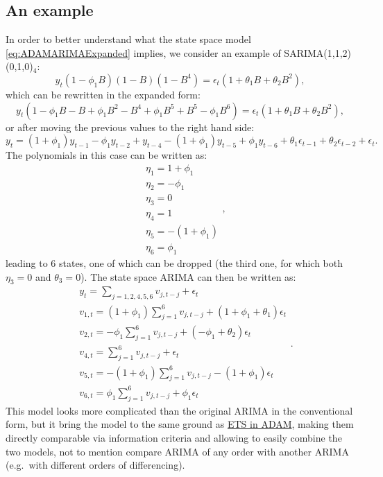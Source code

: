 \documentclass[
]{book}
\theoremstyle{definition}
\theoremstyle{definition}
\theoremstyle{definition}
\theoremstyle{definition}
\theoremstyle{remark}
\begin{document}
\hypertarget{an-example}{%
\subsection{An example}\label{an-example}}

In order to better understand what the state space model \eqref{eq:ADAMARIMAExpanded} implies, we consider an example of SARIMA(1,1,2)(0,1,0)\(_4\):
\begin{equation*}
    {y}_{t} (1- \phi_1 B)(1-B)(1-B^4) = \epsilon_t (1 + \theta_1 B + \theta_2 B^2),
\end{equation*}
which can be rewritten in the expanded form:
\begin{equation*}
    {y}_{t} (1-\phi_1 B - B + \phi_1 B^2 - B^4 +\phi_1 B^5 + B^5 - \phi_1 B^6) = \epsilon_t (1 + \theta_1 B + \theta_2 B^2),
\end{equation*}
or after moving the previous values to the right hand side:
\begin{equation*}
    {y}_{t} = (1+\phi_1) {y}_{t-1} - \phi_1 {y}_{t-2} + {y}_{t-4} - (1+\phi_1) {y}_{t-5} + \phi_1 {y}_{t-6} + \theta_1 \epsilon_{t-1} + \theta_2 \epsilon_{t-2} + \epsilon_t .
\end{equation*}
The polynomials in this case can be written as:
\begin{equation*}
    \begin{aligned}
    & \eta_1 = 1+\phi_1 \\
    & \eta_2 = -\phi_1 \\
    & \eta_3 = 0 \\
    & \eta_4 = 1 \\
    & \eta_5 = - (1+\phi_1) \\
    & \eta_6 = \phi_1
    \end{aligned} ,
\end{equation*}
leading to 6 states, one of which can be dropped (the third one, for which both \(\eta_3=0\) and \(\theta_3=0\)). The state space ARIMA can then be written as:
\begin{equation*}
    \begin{aligned}
    &{y}_{t} = \sum_{j=1,2,4,5,6} v_{j,t-j} + \epsilon_t \\
    & v_{1,t} = (1+\phi_1) \sum_{j=1}^6 v_{j,t-j} + (1+\phi_1+\theta_1) \epsilon_t \\
    & v_{2,t} = -\phi_1 \sum_{j=1}^6 v_{j,t-j} + (-\phi_1+\theta_2) \epsilon_t \\
    & v_{4,t} = \sum_{j=1}^6 v_{j,t-j} + \epsilon_t \\
    & v_{5,t} = -(1+\phi_1) \sum_{j=1}^6 v_{j,t-j} -(1+\phi_1) \epsilon_t \\
    & v_{6,t} = \phi_1 \sum_{j=1}^6 v_{j,t-j} + \phi_1 \epsilon_t
    \end{aligned} .
\end{equation*}
This model looks more complicated than the original ARIMA in the conventional form, but it bring the model to the same ground as \protect\hyperlink{ADAMETSIntroduction}{ETS in ADAM}, making them directly comparable via information criteria and allowing to easily combine the two models, not to mention compare ARIMA of any order with another ARIMA (e.g.~with different orders of differencing).
\end{document}
